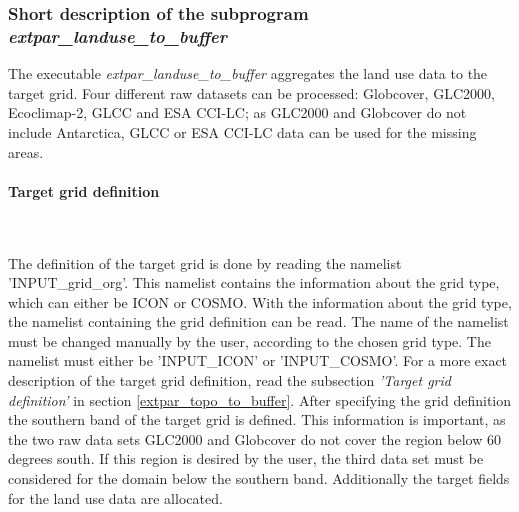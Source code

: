 \documentclass[a4paper,10pt,DIV14,BCOR1cm,titlepage,twoside]{scrartcl}
\begin{document}
\subsubsection{Short description of the subprogram \textit{extpar\_landuse\_to\_buffer}}
The executable \textit{extpar\_landuse\_to\_buffer} aggregates the land use data to the target grid. Four different raw datasets can be processed: Globcover, GLC2000, Ecoclimap-2, GLCC and ESA CCI-LC; as GLC2000 and Globcover do not include Antarctica, GLCC or ESA CCI-LC data can be used for the missing areas.
\paragraph{Target grid definition}\ \par\medskip\noindent
The definition of the target grid is done by reading the namelist 'INPUT\_grid\_org'. This namelist contains the information about the grid type, which can either be ICON or COSMO. With the information about the grid type, the namelist containing the grid definition can be read. The name of the namelist must be changed manually by the user, according to the chosen grid type. The namelist must either be 'INPUT\_ICON' or 'INPUT\_COSMO'. For a more exact description of the target grid definition, read the subsection \textit{'Target grid definition'} in section \ref{extpar_topo_to_buffer}. After specifying the grid definition the southern band of the target grid is defined. This information is important, as the two raw data sets GLC2000 and Globcover do not cover the region below 60 degrees south. If this region is desired by the user, the third data set must be considered for the domain below the southern band. Additionally the target fields for the land use data are allocated. \par\medskip\noindent
 
\end{document}
